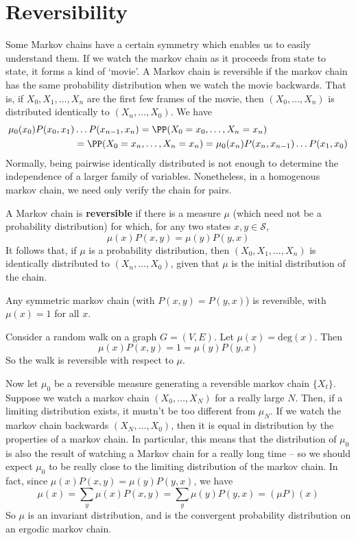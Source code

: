 \chapter{Reversibility}

Some Markov chains have a certain symmetry which enables us to easily understand them. If we watch the markov chain as it proceeds from state to state, it forms a kind of `movie'. A Markov chain is reversible if the markov chain has the same probability distribution when we watch the movie backwards. That is, if $X_0, X_1, \dots, X_n$ are the first few frames of the movie, then $(X_0, \dots, X_n)$ is distributed identically to $(X_n, \dots, X_0)$. We have
%
\begin{align*}
    \mu_0(x_0) P(x_0,x_1)&\dots P(x_{n-1},x_n) = \PP(X_0 = x_0, \dots, X_n = x_n)\\
    &= \PP(X_0 = x_n, \dots, X_n = x_n) = \mu_0(x_n) P(x_n, x_{n-1}) \dots P(x_1,x_0)
\end{align*}
%
Normally, being pairwise identically distributed is not enough to determine the independence of a larger family of variables. Nonetheless, in a homogenous markov chain, we need only verify the chain for pairs.

\begin{definition}
    A Markov chain is {\bf reversible} if there is a measure $\mu$ (which need not be a probability distribution) for which, for any two states $x,y \in \mathcal{S}$,
    \[ \mu(x) P(x,y) = \mu(y) P(y,x) \]
    It follows that, if $\mu$ is a probability distribution, then $(X_0, X_1, \dots,X_n)$ is identically distributed to $(X_n, \dots, X_0)$, given that $\mu$ is the initial distribution of the chain.
\end{definition}

\begin{example}
    Any symmetric markov chain (with $P(x,y) = P(y,x)$) is reversible, with $\mu(x) = 1$ for all $x$.
\end{example}

\begin{example}
    Consider a random walk on a graph $G = (V,E)$. Let $\mu(x) = \text{deg}(x)$. Then
    \[ \mu(x) P(x,y) = 1 = \mu(y) P(y,x) \]
    So the walk is reversible with respect to $\mu$.
\end{example}

Now let $\mu_0$ be a reversible measure  generating a reversible markov chain $\{ X_t \}$. Suppose we watch a markov chain $(X_0, \dots, X_N)$ for a really large $N$. Then, if a limiting distribution exists, it mustn't be too different from $\mu_N$. If we watch the markov chain backwards $(X_N, \dots, X_0)$, then it is equal in distribution by the properties of a markov chain. In particular, this means that the distribution of $\mu_0$ is also the result of watching a Markov chain for a really long time -- so we should expect $\mu_0$ to be really close to the limiting distribution of the markov chain. In fact, since $\mu(x) P(x,y) = \mu(y) P(y,x)$, we have
%
\[ \mu(x) = \sum_y \mu(x) P(x,y) = \sum_y \mu(y) P(y,x) = (\mu P)(x) \]
%
So $\mu$ is an invariant distribution, and is the convergent probability distribution on an ergodic markov chain.

